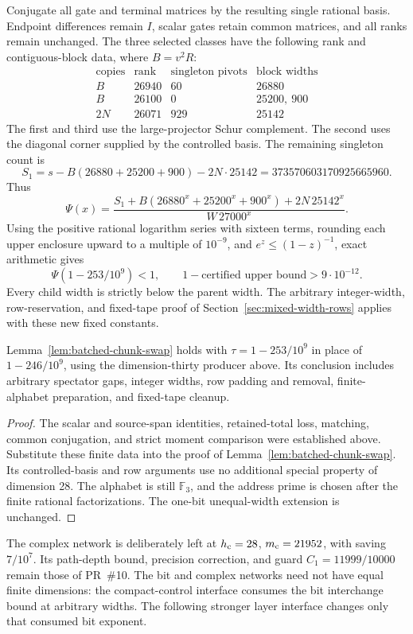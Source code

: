 Conjugate all gate and terminal matrices by the resulting single
rational basis. Endpoint differences remain $I$, scalar gates retain
common matrices, and all ranks remain unchanged. The three selected
classes have the following rank and contiguous-block data, where
$B=v^2R$:
\[
\begin{array}{c|r|r|l}
\text{copies}&\text{rank}&\text{singleton pivots}&\text{block widths}\\\hline
B&26940&60&26880\\
B&26100&0&25200,\ 900\\
2N&26071&929&25142
\end{array}
\]
The first and third use the large-projector Schur complement. The
second uses the diagonal corner supplied by the controlled basis.
The remaining singleton count is
\[
 S_1=s-B(26880+25200+900)-2N\cdot25142
    =373570603170925665960.
\]
Thus
\[
 \Psi(x)=\frac{S_1+B(26880^x+25200^x+900^x)+2N\,25142^x}
                 {W\,27000^x}.
\]
Using the positive rational logarithm series with sixteen terms,
rounding each upper enclosure upward to a multiple of $10^{-9}$,
and $e^z\le(1-z)^{-1}$, exact arithmetic gives
\[
 \Psi(1-253/10^9)<1,\qquad
 1-\text{certified upper bound}>9\cdot10^{-12}.
\]
Every child width is strictly below the parent width. The arbitrary
integer-width, row-reservation, and fixed-tape proof of
Section~\ref{sec:mixed-width-rows} applies with these new fixed constants.

\begin{lemma}
\label{lem:dimension30-chunk-swap}
Lemma~\ref{lem:batched-chunk-swap} holds with $\tau=1-253/10^9$ in place
of $1-246/10^9$, using the dimension-thirty producer above. Its conclusion
includes arbitrary spectator gaps, integer widths, row padding and
removal, finite-alphabet preparation, and fixed-tape cleanup.
\end{lemma}
\begin{proof}
The scalar and source-span identities, retained-total loss, matching,
common conjugation, and strict moment comparison were established above.
Substitute these finite data into the proof of
Lemma~\ref{lem:batched-chunk-swap}. Its controlled-basis and row arguments
use no additional special property of dimension 28. The alphabet is
still $\mathbb F_3$, and the address prime is chosen after the finite
rational factorizations. The one-bit unequal-width extension is
unchanged.
\end{proof}

The complex network is deliberately left at $h_{\rm c}=28$,
$m_{\rm c}=21952$, with saving $7/10^7$. Its path-depth bound,
precision correction, and guard $C_1=11999/10000$ remain those of
PR~\#10. The bit and complex networks need not have equal finite
dimensions: the compact-control interface consumes the bit
interchange bound at arbitrary widths. The following stronger layer
interface changes only that consumed bit exponent.
